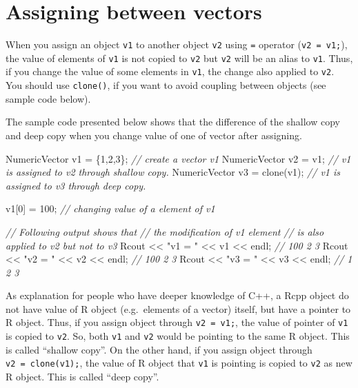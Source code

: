 \documentclass[
]{book}
\newenvironment{Shaded}{\begin{snugshade}}{\end{snugshade}}
\newcommand{\CommentTok}[1]{\textcolor[rgb]{0.56,0.35,0.01}{\textit{#1}}}
\newcommand{\DecValTok}[1]{\textcolor[rgb]{0.00,0.00,0.81}{#1}}
\newcommand{\NormalTok}[1]{#1}
\newcommand{\StringTok}[1]{\textcolor[rgb]{0.31,0.60,0.02}{#1}}
\begin{document}
\hypertarget{assigning-between-vectors}{%
\section{Assigning between vectors}\label{assigning-between-vectors}}

When you assign an object \texttt{v1} to another object \texttt{v2} using \texttt{=} operator (\texttt{v2\ =\ v1;}), the value of elements of \texttt{v1} is not copied to \texttt{v2} but \texttt{v2} will be an alias to \texttt{v1}. Thus, if you change the value of some elements in \texttt{v1}, the change also applied to \texttt{v2}. You should use \texttt{clone()}, if you want to avoid coupling between objects (see sample code below).

The sample code presented below shows that the difference of the shallow copy and deep copy when you change value of one of vector after assigning.

\begin{Shaded}
\begin{Highlighting}[]
\NormalTok{NumericVector v1 = \{}\DecValTok{1}\NormalTok{,}\DecValTok{2}\NormalTok{,}\DecValTok{3}\NormalTok{\};   }\CommentTok{// create a vector v1}
\NormalTok{NumericVector v2 = v1;        }\CommentTok{// v1 is assigned to v2 through shallow copy.}
\NormalTok{NumericVector v3 = clone(v1); }\CommentTok{// v1 is assigned to v3 through deep copy.}

\NormalTok{v1[}\DecValTok{0}\NormalTok{] = }\DecValTok{100}\NormalTok{; }\CommentTok{// changing value of a element of v1}

\CommentTok{// Following output shows that}
\CommentTok{// the modification of v1 element}
\CommentTok{// is also applied to v2 but not to v3}
\NormalTok{Rcout << }\StringTok{"v1 = "}\NormalTok{ << v1 << endl; }\CommentTok{// 100 2 3}
\NormalTok{Rcout << }\StringTok{"v2 = "}\NormalTok{ << v2 << endl; }\CommentTok{// 100 2 3}
\NormalTok{Rcout << }\StringTok{"v3 = "}\NormalTok{ << v3 << endl; }\CommentTok{// 1 2 3}
\end{Highlighting}
\end{Shaded}

As explanation for people who have deeper knowledge of C++, a Rcpp object do not have value of R object (e.g.~elements of a vector) itself, but have a pointer to R object. Thus, if you assign object through \texttt{v2\ =\ v1;}, the value of pointer of \texttt{v1} is copied to \texttt{v2}. So, both \texttt{v1} and \texttt{v2} would be pointing to the same R object. This is called ``shallow copy''. On the other hand, if you assign object through \texttt{v2\ =\ clone(v1);}, the value of R object that \texttt{v1} is pointing is copied to \texttt{v2} as new R object. This is called ``deep copy''.
\end{document}
